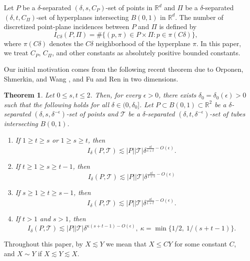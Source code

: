\documentclass[11pt]{article}
\newtheorem{theorem}{Theorem}[section]
\newcommand{\1}{\mathbf{1}}
\begin{document}
Let $P$ be a $\delta$-separated $(\delta, s, C_P)$-set of points in $\mathbb{R}^d$ and $\Pi$ be a $\delta$-separated $(\delta, t, C_\Pi)$-set of hyperplanes intersecting $B(0, 1)$ in $\mathbb{R}^d$. The number of discretized point-plane incidences between $P$ and $\Pi$ is defined by
\[I_{C\delta}(P, \Pi)=\#\{(p, \pi)\in P\times \Pi\colon p\in \pi(C\delta)\},\]
where $\pi(C\delta)$ denotes the $C\delta$ neighborhood of the hyperplane $\pi$. In this paper, we treat $C_P$, $C_\Pi$, and other constants as absolutely positive bounded constants.

Our initial motivation comes from the following recent theorem due to Orponen, Shmerkin, and Wang \cite{motmot}, and Fu and Ren \cite{FuRen} in two dimensions.
\begin{theorem}\label{twodimension}
    Let $0\le s, t\le 2$. Then, for every $\epsilon>0$, there exists $\delta_0=\delta_0(\epsilon)>0$ such that the following holds for all $\delta\in (0, \delta_0]$. Let $P\subset B(0, 1)\subset \mathbb{R}^2$ be a $\delta$-separated $(\delta, s, \delta^{-\epsilon})$-set of points and $\mathcal{T}$ be a $\delta$-separated $(\delta, t, \delta^{-\epsilon})$-set of tubes intersecting $B(0, 1)$.
    \begin{enumerate}
        \item If $1\ge t\ge s$ or $1\ge s\ge t$, then
              \[I_{\delta}(P, \mathcal{T})\lesssim |P||\mathcal{T}|\delta^{\frac{st}{s+t}-O(\epsilon)}.\]
        \item If $t\ge 1\ge s\ge t-1$, then
              \[I_{\delta}(P, \mathcal{T})\lesssim |P||\mathcal{T}|\delta^{\frac{st}{1+s}-O(\epsilon)}\]
        \item If $s\ge 1\ge t\ge s-1$, then
              \[I_{\delta}(P, \mathcal{T})\lesssim |P||\mathcal{T}|\delta^{\frac{st}{1+t}-O(\epsilon)}.\]
        \item If $t>1$ and $s>1$, then
              \[I_{\delta}(P, \mathcal{T})\lesssim |P||\mathcal{T}|\delta^{\kappa(s+t-1)-O(\epsilon)},~\kappa=\min \{1/2, ~1/(s+t-1)\}.\]
    \end{enumerate}
\end{theorem}
Throughout this paper, by $X\lesssim Y$ we mean that $X\le CY$ for some constant $C$, and $X\sim Y$ if $X\lesssim Y\lesssim X$.
\end{document}
